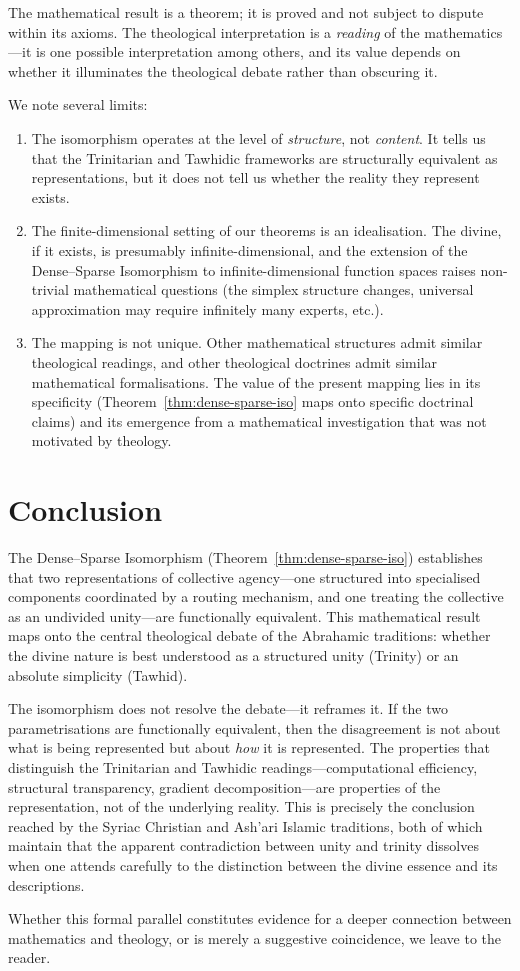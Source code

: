 The mathematical result is a theorem; it is proved and not subject to dispute within its axioms. The theological interpretation is a \emph{reading} of the mathematics---it is one possible interpretation among others, and its value depends on whether it illuminates the theological debate rather than obscuring it.

We note several limits:

\begin{enumerate}[label=(\alph*)]
  \item The isomorphism operates at the level of \emph{structure}, not \emph{content}. It tells us that the Trinitarian and Tawhidic frameworks are structurally equivalent as representations, but it does not tell us whether the reality they represent exists.
  \item The finite-dimensional setting of our theorems is an idealisation. The divine, if it exists, is presumably infinite-dimensional, and the extension of the Dense--Sparse Isomorphism to infinite-dimensional function spaces raises non-trivial mathematical questions (the simplex structure changes, universal approximation may require infinitely many experts, etc.).
  \item The mapping is not unique. Other mathematical structures admit similar theological readings, and other theological doctrines admit similar mathematical formalisations. The value of the present mapping lies in its specificity (Theorem~\ref{thm:dense-sparse-iso} maps onto specific doctrinal claims) and its emergence from a mathematical investigation that was not motivated by theology.
\end{enumerate}

\section{Conclusion}
\label{sec:theology-conclusion}

The Dense--Sparse Isomorphism (Theorem~\ref{thm:dense-sparse-iso}) establishes that two representations of collective agency---one structured into specialised components coordinated by a routing mechanism, and one treating the collective as an undivided unity---are functionally equivalent. This mathematical result maps onto the central theological debate of the Abrahamic traditions: whether the divine nature is best understood as a structured unity (Trinity) or an absolute simplicity (Tawhid).

The isomorphism does not resolve the debate---it reframes it. If the two parametrisations are functionally equivalent, then the disagreement is not about what is being represented but about \emph{how} it is represented. The properties that distinguish the Trinitarian and Tawhidic readings---computational efficiency, structural transparency, gradient decomposition---are properties of the representation, not of the underlying reality. This is precisely the conclusion reached by the Syriac Christian and Ash'ari Islamic traditions, both of which maintain that the apparent contradiction between unity and trinity dissolves when one attends carefully to the distinction between the divine essence and its descriptions.

Whether this formal parallel constitutes evidence for a deeper connection between mathematics and theology, or is merely a suggestive coincidence, we leave to the reader.
